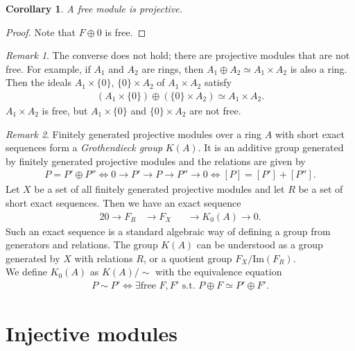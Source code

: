 \documentclass[12pt]{report}
\theoremstyle{plain}
\newtheorem{corollary}[theorem]{Corollary}
\theoremstyle{remark}
\newtheorem*{remark}{Remark}
\theoremstyle{definition}
\begin{document}
\begin{corollary}
    A free module is projective.
\end{corollary}
\begin{proof}
    Note that $F\oplus 0$ is free.
\end{proof}
\begin{remark}
    The converse does not hold; there are projective modules that are not free. For example, if $A_1$ and $A_2$ are rings, then $A_1\oplus A_2\simeq A_1\times A_2$ is also a ring. Then the ideals $A_1\times\{0\}$, $\{0\}\times A_2$ of $A_1\times A_2$ satisfy
    \begin{align*}
        (A_1\times\{0\})\oplus (\{0\}\times A_2) \simeq A_1\times A_2.
    \end{align*}
    $A_1\times A_2$ is free, but $A_1\times \{0\}$ and $\{0\}\times A_2$ are not free.
\end{remark}

\begin{remark}
    Finitely generated projective modules over a ring $A$ with short exact sequences form a \emph{Grothendieck group} $K(A)$. It is an additive group generated by finitely generated projective modules and the relations are given by
    \begin{align*}
        P=P'\oplus P''\iff 0\rightarrow P'\rightarrow P\rightarrow P'' \rightarrow 0 \iff [P]=[P']+[P''].
    \end{align*}
    Let $X$ be a set of all finitely generated projective modules and let $R$ be a set of short exact sequences. Then we have an exact sequence
    \begin{alignat*}{2}
        0\rightarrow F_R &\rightarrow F_X&& \rightarrow K_0(A)\rightarrow 0. 
    \end{alignat*}
    Such an exact sequence is a standard algebraic way of defining a group from generators and relations. The group $K(A)$ can be understood as a group generated by $X$ with relations $R$, or a quotient group $F_X/\mathrm{Im}(F_R)$. \\
    We define $K_0(A)$ as $K(A)/\sim$ with the equivalence equation
    \begin{align*}
        P\sim P' \iff \exists \text{free }F,F'\text{ s.t. }P\oplus F\simeq P'\oplus F'.
    \end{align*}
\end{remark}





\section{Injective modules}
\end{document}
